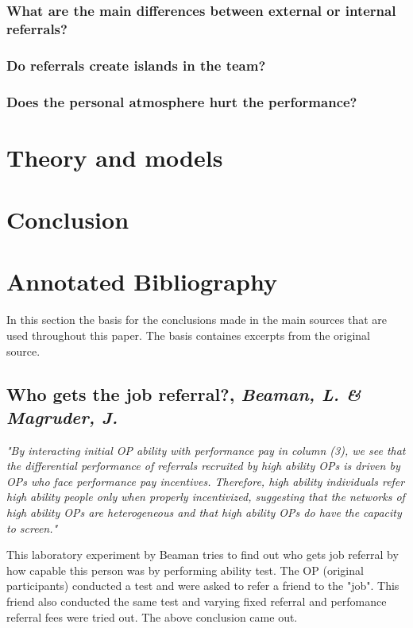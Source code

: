 \documentclass[a4paper, 11pt]{article} %
\begin{document}
\subsubsection*{What are the main differences between external or internal referrals?}
\subsubsection*{Do referrals create islands in the team?}
\subsubsection*{Does the personal atmosphere hurt the performance?}

\section*{Theory and models}

\section*{Conclusion}

\section*{Annotated Bibliography}
In this section the basis for the conclusions made in the main sources that are used throughout this paper. The basis containes excerpts from the original source.

\subsection*{Who gets the job referral?, \emph{Beaman, L. \& Magruder, J.} \cite{first}}

\emph{"By interacting initial OP ability with performance pay in column (3), we see that the differential
performance of referrals recruited by high ability OPs is driven by OPs who face performance
pay incentives. Therefore, high ability individuals refer high ability people only when properly
incentivized, suggesting that the networks of high ability OPs are heterogeneous and that high
ability OPs do have the capacity to screen."}

This laboratory experiment by Beaman tries to find out who gets job referral by how capable this person was by performing ability test. The OP (original participants) conducted a test and were asked to refer a friend to the "job". This friend also conducted the same test and varying fixed referral and perfomance referral fees were tried out. The above conclusion came out.
\end{document}

